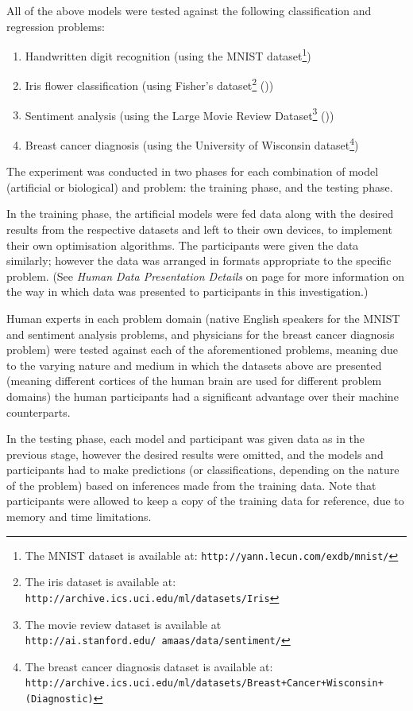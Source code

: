 \documentclass[]{report}
\begin{document}
All of the above models were tested against the following classification and regression problems:

\begin{enumerate}
	\item Handwritten digit recognition (using the MNIST dataset\footnote{The MNIST dataset is available at: \texttt{http://yann.lecun.com/exdb/mnist/}})
	\item Iris flower classification (using Fisher's dataset\footnote{The iris dataset is available at: \texttt{http://archive.ics.uci.edu/ml/datasets/Iris}} (\cite{uciml2007}))
	\item Sentiment analysis (using the Large Movie Review Dataset\footnote{The movie review dataset is available at \texttt{http://ai.stanford.edu/~amaas/data/sentiment/}} (\cite{maas2011imdb}))
	\item Breast cancer diagnosis (using the University of Wisconsin dataset\footnote{The breast cancer diagnosis dataset is available at: \texttt{http://archive.ics.uci.edu/ml/datasets/Breast+Cancer+\newline Wisconsin+(Diagnostic)}})
\end{enumerate}

The experiment was conducted in two phases for each combination of model (artificial or biological) and problem: the training phase, and the testing phase.

In the training phase, the artificial models were fed data along with the desired results from the respective datasets and left to their own devices, to implement their own optimisation algorithms. The participants were given the data similarly; however the data was arranged in formats appropriate to the specific problem. (See \emph{Human Data Presentation Details} on page \pageref{sec:Appendix_II} for more information on the way in which data was presented to participants in this investigation.)

Human experts in each problem domain (native English speakers for the MNIST and sentiment analysis problems, and physicians for the breast cancer diagnosis problem) were tested against each of the aforementioned problems, meaning due to the varying nature and medium in which the datasets above are presented (meaning different cortices of the human brain are used for different problem domains) the human participants had a significant advantage over their machine counterparts. 

In the testing phase, each model and participant was given data as in the previous stage, however the desired results were omitted, and the models and participants had to make predictions (or classifications, depending on the nature of the problem) based on inferences made from the training data. Note that participants were allowed to keep a copy of the training data for reference, due to memory and time limitations.
\end{document}

